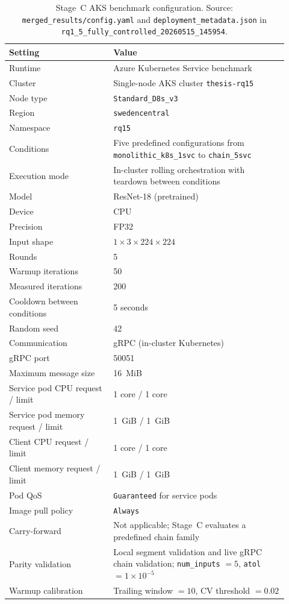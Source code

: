 \begin{table}[ht]
\centering
\caption[Stage~C AKS benchmark configuration]{Stage~C AKS benchmark configuration. Source: \texttt{merged\_results/config.yaml} and \texttt{deployment\_metadata.json} in \texttt{rq1\_5\_fully\_controlled\_20260515\_145954}.}
\label{tab:rq15_config}
\begin{tabular}{p{0.34\linewidth}p{0.58\linewidth}}
\toprule
\textbf{Setting} & \textbf{Value} \\
\midrule
Runtime & Azure Kubernetes Service benchmark \\
Cluster & Single-node AKS cluster \texttt{thesis-rq15} \\
Node type & \texttt{Standard\_D8s\_v3} \\
Region & \texttt{swedencentral} \\
Namespace & \texttt{rq15} \\
Conditions & Five predefined configurations from \texttt{monolithic\_k8s\_1svc} to \texttt{chain\_5svc} \\
Execution mode & In-cluster rolling orchestration with teardown between conditions \\
Model & ResNet-18 (pretrained) \\
Device & CPU \\
Precision & FP32 \\
Input shape & $1 \times 3 \times 224 \times 224$ \\
Rounds & 5 \\
Warmup iterations & 50 \\
Measured iterations & 200 \\
Cooldown between conditions & 5 seconds \\
Random seed & 42 \\
Communication & gRPC (in-cluster Kubernetes) \\
gRPC port & 50051 \\
Maximum message size & 16~MiB \\
Service pod CPU request / limit & 1 core / 1 core \\
Service pod memory request / limit & 1~GiB / 1~GiB \\
Client CPU request / limit & 1 core / 1 core \\
Client memory request / limit & 1~GiB / 1~GiB \\
Pod QoS & \texttt{Guaranteed} for service pods \\
Image pull policy & \texttt{Always} \\
Carry-forward & Not applicable; Stage~C evaluates a predefined chain family \\
Parity validation & Local segment validation and live gRPC chain validation; \texttt{num\_inputs} $= 5$, \texttt{atol} $= 1 \times 10^{-5}$ \\
Warmup calibration & Trailing window $= 10$, CV threshold $= 0.02$ \\
\bottomrule
\end{tabular}
\end{table}

